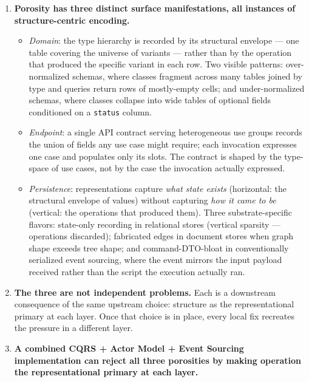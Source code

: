 \documentclass[
]{article}
\providecommand{\tightlist}{%
  \setlength{\itemsep}{0pt}\setlength{\parskip}{0pt}}
\let\origtexttt\texttt%
\renewcommand{\texttt}[1]{\origtexttt{\seqsplit{#1}}}%
\let\texttt\origtexttt%
\begin{document}
\begin{enumerate}
\def\labelenumi{\arabic{enumi}.}
\item
  \textbf{Porosity has three distinct surface manifestations, all
  instances of structure-centric encoding.}

  \begin{itemize}
  \tightlist
  \item
    \emph{Domain}: the type hierarchy is recorded by its structural
    envelope --- one table covering the universe of variants --- rather
    than by the operation that produced the specific variant in each
    row. Two visible patterns: over-normalized schemas, where classes
    fragment across many tables joined by type and queries return rows
    of mostly-empty cells; and under-normalized schemas, where classes
    collapse into wide tables of optional fields conditioned on a
    \texttt{status} column.
  \item
    \emph{Endpoint}: a single API contract serving heterogeneous use
    groups records the union of fields any use case might require; each
    invocation expresses one case and populates only its slots. The
    contract is shaped by the type-space of use cases, not by the case
    the invocation actually expressed.
  \item
    \emph{Persistence}: representations capture \emph{what state exists}
    (horizontal: the structural envelope of values) without capturing
    \emph{how it came to be} (vertical: the operations that produced
    them). Three substrate-specific flavors: state-only recording in
    relational stores (vertical sparsity --- operations discarded);
    fabricated edges in document stores when graph shape exceeds tree
    shape; and command-DTO-bloat in conventionally serialized event
    sourcing, where the event mirrors the input payload received rather
    than the script the execution actually ran.
  \end{itemize}
\item
  \textbf{The three are not independent problems.} Each is a downstream
  consequence of the same upstream choice: structure as the
  representational primary at each layer. Once that choice is in place,
  every local fix recreates the pressure in a different layer.
\item
  \textbf{A combined CQRS + Actor Model + Event Sourcing implementation
  can reject all three porosities by making operation the
  representational primary at each layer.}


\end{enumerate}
\end{document}
